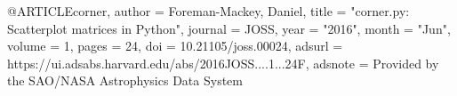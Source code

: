 
@ARTICLE{corner,
       author = {{Foreman-Mackey}, Daniel},
        title = "{corner.py: Scatterplot matrices in Python}",
      journal = {JOSS},
         year = "2016",
        month = "Jun",
       volume = {1},
        pages = {24},
          doi = {10.21105/joss.00024},
       adsurl = {https://ui.adsabs.harvard.edu/abs/2016JOSS....1...24F},
      adsnote = {Provided by the SAO/NASA Astrophysics Data System}
}
